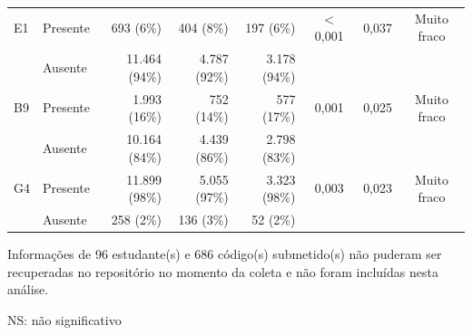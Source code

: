 \begin{table}[H]
\begin{threeparttable}
\begin{tabular}{ll rrr ccc}
        \midrule
        E1 & Presente & 693 (6\%) & 404 (8\%) & 197 (6\%) & $<$ 0,001 & 0,037 & Muito fraco \\
           & Ausente & 11.464 (94\%) & 4.787 (92\%) & 3.178 (94\%) & & & \\
        \midrule
        B9 & Presente & 1.993 (16\%) & 752 (14\%) & 577 (17\%) & 0,001 & 0,025 & Muito fraco \\
           & Ausente & 10.164 (84\%) & 4.439 (86\%) & 2.798 (83\%) & & & \\
        \midrule
        G4 & Presente & 11.899 (98\%) & 5.055 (97\%) & 3.323 (98\%) & 0,003 & 0,023 & Muito fraco \\
           & Ausente & 258 (2\%) & 136 (3\%) & 52 (2\%) & & & \\
        \bottomrule
    \end{tabular}

    \begin{tablenotes}
        \item Informações de 96 estudante(s) e 686 código(s) submetido(s) não puderam ser recuperadas no repositório no momento da coleta e não foram incluídas nesta análise.
        \item NS: não significativo
    \end{tablenotes}
    \end{threeparttable}
\end{table}

